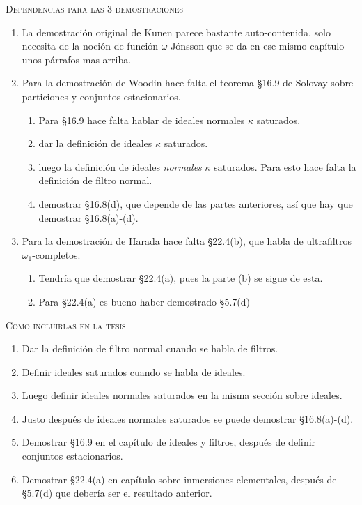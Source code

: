 \documentclass[12pt]{article}
\begin{document}
\textsc{Dependencias para las 3 demostraciones}

\begin{enumerate}
  \item La demostración original de Kunen parece bastante auto-contenida,
    solo necesita de la noción de función $\omega$-Jónsson que se da en ese
    mismo capítulo unos párrafos mas arriba.
  \item Para la demostración de Woodin hace falta el teorema \S16.9 de Solovay sobre
    particiones y conjuntos estacionarios.
    \begin{enumerate}
      \item Para \S16.9 hace falta hablar de ideales normales $\kappa$ saturados.
      \item dar la definición de ideales $\kappa$ saturados.
      \item luego la definición de ideales \emph{normales} $\kappa$ saturados.
        Para esto hace falta la definición de filtro normal.
      \item demostrar \S16.8(d), que depende de las partes anteriores,
        así que hay que demostrar \S16.8(a)-(d).
    \end{enumerate}
  \item Para la demostración de Harada hace falta \S22.4(b), que habla de
    ultrafiltros $\omega_1$-completos.
    \begin{enumerate}
      \item Tendría que demostrar \S22.4(a), pues la parte (b) se sigue de esta.
      \item Para \S22.4(a) es bueno haber demostrado \S5.7(d)
    \end{enumerate}
\end{enumerate}

\textsc{Como incluirlas en la tesis}

\begin{enumerate}
  \item Dar la definición de filtro normal cuando se habla de filtros.
  \item Definir ideales saturados cuando se habla de ideales.
  \item Luego definir ideales normales saturados en la misma sección sobre ideales.
  \item Justo después de ideales normales saturados se puede demostrar \S16.8(a)-(d).
  \item Demostrar \S16.9 en el capítulo de ideales y filtros, después de definir
    conjuntos estacionarios.
  \item Demostrar \S22.4(a) en capítulo sobre inmersiones elementales,
    después de \S5.7(d) que debería ser el resultado anterior.
\end{enumerate}
\end{document}
